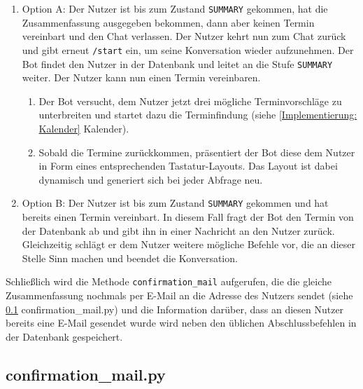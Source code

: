                 \begin{enumerate}
                
                    \item Option A:  Der Nutzer ist bis zum Zustand \verb|SUMMARY| gekommen, hat die Zusammenfassung ausgegeben bekommen, dann aber keinen Termin vereinbart und den Chat verlassen. Der Nutzer kehrt nun zum Chat zurück und gibt erneut \verb|/start| ein, um seine Konversation wieder aufzunehmen. Der Bot findet den Nutzer in der Datenbank und leitet an die Stufe \verb|SUMMARY| weiter. Der Nutzer kann nun einen Termin vereinbaren. \\
                    
                    \begin{enumerate}
                        \item Der Bot versucht, dem Nutzer jetzt drei mögliche Terminvorschläge zu unterbreiten und startet dazu die Terminfindung (siehe \ref{Implementierung: Kalender} Kalender).
                        \item Sobald die Termine zurückkommen, präsentiert der Bot diese dem Nutzer in Form eines entsprechenden Tastatur-Layouts. Das Layout ist dabei dynamisch und generiert sich bei jeder Abfrage neu.
                    \end{enumerate}
                
                    \item Option B: Der Nutzer ist bis zum Zustand \verb|SUMMARY| gekommen und hat bereits einen Termin vereinbart. In diesem Fall fragt der Bot den Termin von der Datenbank ab und gibt ihn in einer Nachricht an den Nutzer zurück. Gleichzeitig schlägt er dem Nutzer weitere mögliche Befehle vor, die an dieser Stelle Sinn machen und beendet die Konversation.
                
                \end{enumerate}

            Schließlich wird die Methode \verb|confirmation_mail| aufgerufen, die die gleiche Zusammenfassung nochmals per E-Mail an die Adresse des Nutzers sendet (siehe \ref{Implementierung: confirmation_mail.py} confirmation\_mail.py) und die Information darüber, dass an diesen Nutzer bereits eine E-Mail gesendet wurde wird neben den üblichen Abschlussbefehlen in der Datenbank gespeichert.

                    
        \subsection{confirmation\_mail.py} \label{Implementierung: confirmation_mail.py}

